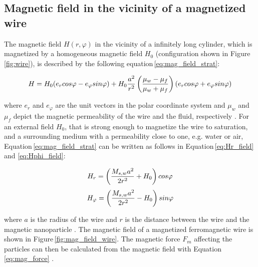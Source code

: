 \subsection{Magnetic field in the vicinity of a magnetized wire}
\label{subsec:mag_field}
The magnetic field $H(r,\varphi)$ in the vicinity of a infinitely long cylinder, which is magnetized by a homogeneous magnetic field $H_{0}$ (configuration shown in Figure\,\ref{fig:wire}), is described by the following equation\,\ref{eq:mag_field_strat}:

\begin{equation}
\label{eq:mag_field_strat}
\centering
H = H_{0}(e_{r}cos\varphi-e_{\varphi}sin\varphi)+H_{0}\frac{a^{2}}{r^{2}}\left(\frac{\mu_{w}-\mu_{f}}{\mu_{w}+\mu_{f}}\right)(e_{r}cos\varphi+e_{\varphi}sin\varphi)
\end{equation}

where $e_{r}$ and $e_{\varphi}$ are the unit vectors in the polar coordinate system and $\mu_{w}$ and $\mu_{f}$ depict the magnetic permeability of the wire and the fluid, respectively \cite{stratton2007electromagnetic}. For an external field $H_{0}$, that is strong enough to magnetize the wire to saturation, and a surrounding medium with a permeability close to one, e.g. water or air, Equation\,\ref{eq:mag_field_strat} can be written as follows in Equation\,\ref{eq:Hr_field} and \ref{eq:Hphi_field}:

\begin{equation}
\label{eq:Hr_field}
\centering
H_{r} = \left(\frac{M_{s,w}a^{2}}{2r^{2}}+H_{0}\right)cos\varphi
\end{equation}
\begin{equation}
\label{eq:Hphi_field}
\centering
H_{\varphi} = \left(\frac{M_{s,w}a^{2}}{2r^{2}}-H_{0}\right)sin\varphi
\end{equation}

where $a$ is the radius of the wire and $r$ is the distance between the wire and the magnetic nanoparticle \cite{FranzrebHabil}. The magnetic field of a magnetized ferromagnetic wire is shown in Figure\,\ref{fig:mag_field_wire}. The magnetic force $F_{m}$ affecting the particles can then be calculated from the magnetic field with Equation\,\ref{eq:mag_force} \cite{moeser2004high}. 

